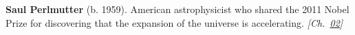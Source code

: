 \nobelphysics \textbf{Saul Perlmutter} (b. 1959). American astrophysicist who shared the 2011 Nobel Prize for discovering that the expansion of the universe is accelerating. \emph{[Ch.~\hyperref[ch:acceleratinguniverse]{02}]}

